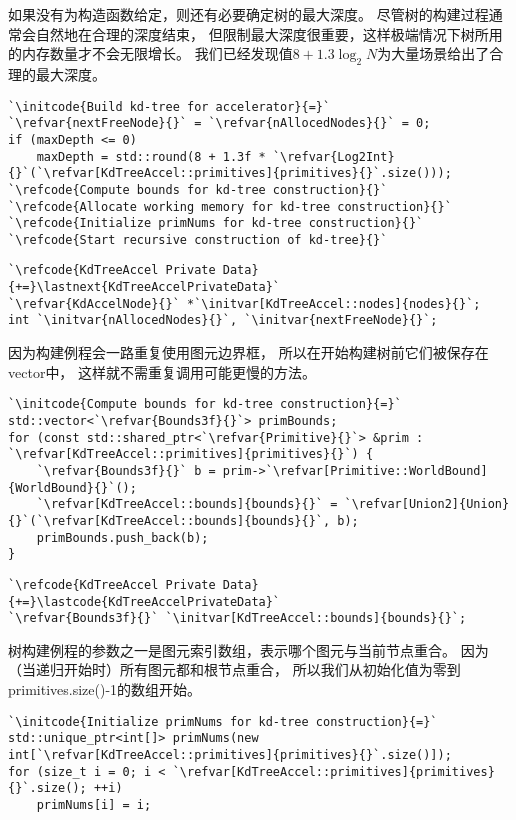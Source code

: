 如果没有为构造函数给定，则还有必要确定树的最大深度。
尽管树的构建过程通常会自然地在合理的深度结束，
但限制最大深度很重要，这样极端情况下树所用的内存数量才不会无限增长。
我们已经发现值$8+1.3\log_2N$为大量场景给出了合理的最大深度。

\begin{lstlisting}
`\initcode{Build kd-tree for accelerator}{=}`
`\refvar{nextFreeNode}{}` = `\refvar{nAllocedNodes}{}` = 0;
if (maxDepth <= 0)
    maxDepth = std::round(8 + 1.3f * `\refvar{Log2Int}{}`(`\refvar[KdTreeAccel::primitives]{primitives}{}`.size()));
`\refcode{Compute bounds for kd-tree construction}{}`
`\refcode{Allocate working memory for kd-tree construction}{}`
`\refcode{Initialize primNums for kd-tree construction}{}`
`\refcode{Start recursive construction of kd-tree}{}`
\end{lstlisting}

\begin{lstlisting}
`\refcode{KdTreeAccel Private Data}{+=}\lastnext{KdTreeAccelPrivateData}`
`\refvar{KdAccelNode}{}` *`\initvar[KdTreeAccel::nodes]{nodes}{}`;
int `\initvar{nAllocedNodes}{}`, `\initvar{nextFreeNode}{}`;
\end{lstlisting}

因为构建例程会一路重复使用图元边界框，
所以在开始构建树前它们被保存在{\ttfamily vector}中，
这样就不需重复调用可能更慢的方法。
\begin{lstlisting}
`\initcode{Compute bounds for kd-tree construction}{=}`
std::vector<`\refvar{Bounds3f}{}`> primBounds;
for (const std::shared_ptr<`\refvar{Primitive}{}`> &prim : `\refvar[KdTreeAccel::primitives]{primitives}{}`) {
    `\refvar{Bounds3f}{}` b = prim->`\refvar[Primitive::WorldBound]{WorldBound}{}`();
    `\refvar[KdTreeAccel::bounds]{bounds}{}` = `\refvar[Union2]{Union}{}`(`\refvar[KdTreeAccel::bounds]{bounds}{}`, b);
    primBounds.push_back(b);
}
\end{lstlisting}

\begin{lstlisting}
`\refcode{KdTreeAccel Private Data}{+=}\lastcode{KdTreeAccelPrivateData}`
`\refvar{Bounds3f}{}` `\initvar[KdTreeAccel::bounds]{bounds}{}`;
\end{lstlisting}

树构建例程的参数之一是图元索引数组，表示哪个图元与当前节点重合。
因为（当递归开始时）所有图元都和根节点重合，
所以我们从初始化值为零到{\ttfamily primitives.size()-1}的数组开始。
\begin{lstlisting}
`\initcode{Initialize primNums for kd-tree construction}{=}`
std::unique_ptr<int[]> primNums(new int[`\refvar[KdTreeAccel::primitives]{primitives}{}`.size()]);
for (size_t i = 0; i < `\refvar[KdTreeAccel::primitives]{primitives}{}`.size(); ++i)
    primNums[i] = i;
\end{lstlisting}

